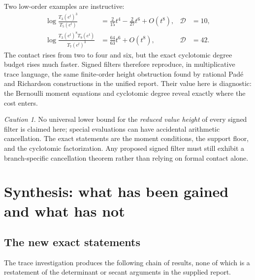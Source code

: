 \documentclass[11pt,oneside]{article}
\theoremstyle{definition}
\theoremstyle{remark}
\newtheorem{warning}[theorem]{Caution}
\begin{document}
Two low-order examples are instructive:
\begin{align}
 \log\frac{T_3(e^t)^3}{T_5(e^t)}
 &=\frac{2}{15}t^4-\frac{2}{27}t^6+O(t^8),
 &\mathcal D&=10,
 \label{eq:filter-order4}\\
 \log\frac{T_3(e^t)^8T_9(e^t)}{T_7(e^t)^3}
 &=\frac{64}{63}t^6+O(t^8),
 &\mathcal D&=42.
 \label{eq:filter-order6}
\end{align}
The contact rises from two to four and six, but the exact cyclotomic degree budget rises much
faster.  Signed filters therefore reproduce, in multiplicative trace language, the same
finite-order height obstruction found by rational Pad\'e and Richardson constructions in the
unified report.  Their value here is diagnostic: the Bernoulli moment equations and
cyclotomic degree reveal exactly where the cost enters.

\begin{warning}
No universal lower bound for the \emph{reduced value height} of every signed filter is claimed
here; special evaluations can have accidental arithmetic cancellation.  The exact statements
are the moment conditions, the support floor, and the cyclotomic factorization.  Any proposed
signed filter must still exhibit a branch-specific cancellation theorem rather than relying
on formal contact alone.
\end{warning}

\section{Synthesis: what has been gained and what has not}
\label{sec:synthesis}

\subsection{The new exact statements}

The trace investigation produces the following chain of results, none of which is a restatement
of the determinant or secant arguments in the supplied report.
\end{document}
